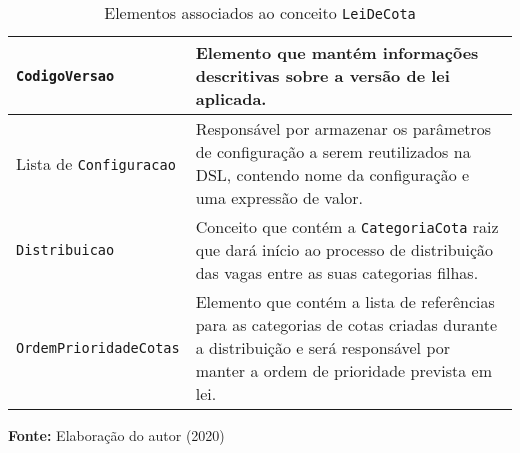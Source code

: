 \begin{table}[ht]
\caption{Elementos associados ao conceito \texttt{LeiDeCota}}
\label{tblelementoslei}
\centering
\begin{tabular}{|p{4.2cm}|p{10cm}|}
\hline
\texttt{CodigoVersao}          & Elemento que mantém informações descritivas sobre a versão de lei aplicada.                                                                                           \\ \hline
Lista de \texttt{Configuracao} & Responsável por armazenar os parâmetros de configuração a serem reutilizados na DSL, contendo nome da configuração e uma expressão de valor.                          \\ \hline
\texttt{Distribuicao}          & Conceito que contém a \texttt{CategoriaCota} raiz que dará início ao processo de distribuição das vagas entre as suas categorias filhas.                                       \\ \hline
\texttt{OrdemPrioridadeCotas}  & Elemento que contém a lista de referências para as categorias de cotas criadas durante a distribuição e será responsável por manter a ordem de prioridade prevista em lei. \\ \hline
\end{tabular}
  \par\medskip\textbf{Fonte:} Elaboração do autor (2020) \par\medskip
\end{table}

   
    